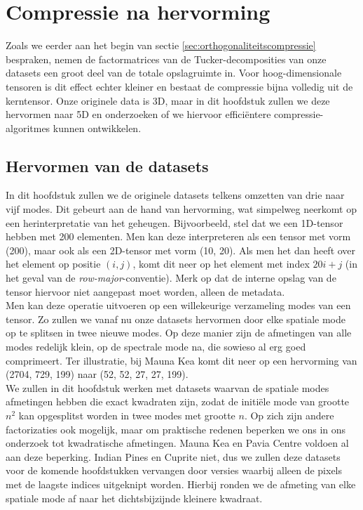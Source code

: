 \chapter{Compressie na hervorming}
\label{hoofdstuk:hervorming}

Zoals we eerder aan het begin van sectie \ref{sec:orthogonaliteitscompressie} bespraken, nemen de factormatrices van de Tucker-decomposities van onze datasets een groot deel van de totale opslagruimte in. Voor hoog-dimensionale tensoren is dit effect echter kleiner en bestaat de compressie bijna volledig uit de kerntensor. Onze originele data is 3D, maar in dit hoofdstuk zullen we deze hervormen naar 5D en onderzoeken of we hiervoor effici\"entere compressie-algoritmes kunnen ontwikkelen.

\section{Hervormen van de datasets}

In dit hoofdstuk zullen we de originele datasets telkens omzetten van drie naar vijf modes. Dit gebeurt aan de hand van hervorming, wat simpelweg neerkomt op een herinterpretatie van het geheugen. Bijvoorbeeld, stel dat we een 1D-tensor hebben met 200 elementen. Men kan deze interpreteren als een tensor met vorm (200), maar ook als een 2D-tensor met vorm (10, 20). Als men het dan heeft over het element op positie $(i, j)$, komt dit neer op het element met index $20i + j$ (in het geval van de \textit{row-major}-conventie). Merk op dat de interne opslag van de tensor hiervoor niet aangepast moet worden, alleen de metadata.\\

Men kan deze operatie uitvoeren op een willekeurige verzameling modes van een tensor. Zo zullen we vanaf nu onze datasets hervormen door elke spatiale mode op te splitsen in twee nieuwe modes. Op deze manier zijn de afmetingen van alle modes redelijk klein, op de spectrale mode na, die sowieso al erg goed comprimeert. Ter illustratie, bij Mauna Kea komt dit neer op een hervorming van (2704, 729, 199) naar (52, 52, 27, 27, 199).\\

We zullen in dit hoofdstuk werken met datasets waarvan de spatiale modes afmetingen hebben die exact kwadraten zijn, zodat de initi\"ele mode van grootte $n^2$ kan opgesplitst worden in twee modes met grootte $n$. Op zich zijn andere factorizaties ook mogelijk, maar om praktische redenen beperken we ons in ons onderzoek tot kwadratische afmetingen. Mauna Kea en Pavia Centre voldoen al aan deze beperking. Indian Pines en Cuprite niet, dus we zullen deze datasets voor de komende hoofdstukken vervangen door versies waarbij alleen de pixels met de laagste indices uitgeknipt worden. Hierbij ronden we de afmeting van elke spatiale mode af naar het dichtsbijzijnde kleinere kwadraat.

